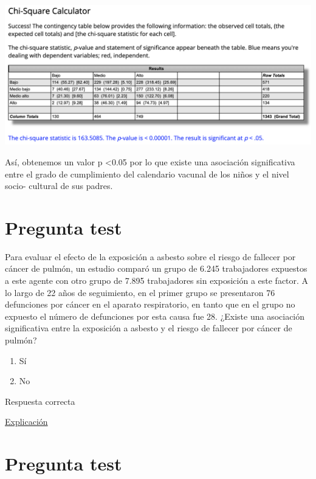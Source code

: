 \documentclass[
]{book}
\providecommand{\tightlist}{%
  \setlength{\itemsep}{0pt}\setlength{\parskip}{0pt}}
\begin{document}
\includegraphics[width=20.44in]{img/5_5}

Así, obtenemos un valor p \textless0.05 por lo que existe una asociación significativa entre el grado de cumplimiento del calendario vacunal de los niños y el nivel socio- cultural de sus padres.

\hypertarget{pregunta-test-153}{%
\section{Pregunta test}\label{pregunta-test-153}}

Para evaluar el efecto de la exposición a asbesto sobre el riesgo de fallecer por cáncer de pulmón, un estudio comparó un grupo de 6.245 trabajadores expuestos a este agente con otro grupo de 7.895 trabajadores sin exposición a este factor. A lo largo de 22 años de seguimiento, en el primer grupo se presentaron 76 defunciones por cáncer en el aparato respiratorio, en tanto que en el grupo no expuesto el número de defunciones por esta causa fue 28. ¿Existe una asociación significativa entre la exposición a asbesto y el riesgo de fallecer por cáncer de pulmón?

\begin{enumerate}
\def\labelenumi{\alph{enumi})}
\tightlist
\item
  Sí
\item
  No
\end{enumerate}

Respuesta correcta

\href{https://1fjmanzano.github.io/bioestadistica/me\%CC\%81todos-de-inferencia-estadi\%CC\%81stica.html\#prueba-de-la-chi-cuadrado}{Explicación}

\hypertarget{pregunta-test-154}{%
\section{Pregunta test}\label{pregunta-test-154}}
\end{document}
